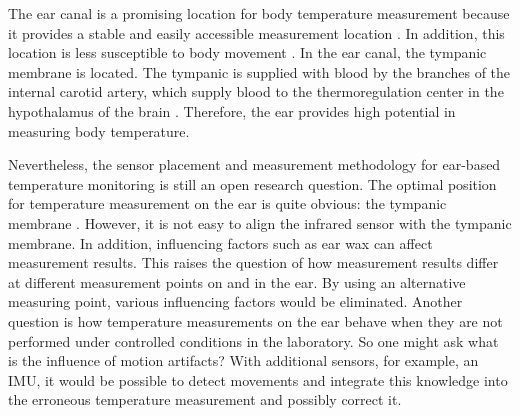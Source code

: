 The ear canal is a promising location for body temperature measurement because it provides a stable and easily accessible measurement location \cite{ericksonComparisonEarbasedBladder1993}.
In addition, this location is less susceptible to body movement \cite{grossmanFrequencyVelocityRotational1988, kavanaghRoleNeckTrunk2006a}.
In the ear canal, the tympanic membrane is located.
The tympanic is supplied with blood by the branches of the internal carotid artery, which supply blood to the thermoregulation center in the hypothalamus of the brain \cite{moranCoreTemperatureMeasurement2002a}.
Therefore, the ear provides high potential in measuring body temperature.

Nevertheless, the sensor placement and measurement methodology for ear-based temperature monitoring is still an open research question. 
The optimal position for temperature measurement on the ear is quite obvious: the tympanic membrane \cite{childsTympanicMembraneTemperature1999, kimComparisonBilateralEardrum2022, mumaComparisonRectalAxillary1991}.
However, it is not easy to align the infrared sensor with the tympanic membrane.
In addition, influencing factors such as ear wax can affect measurement results. 
This raises the question of how measurement results differ at different measurement points on and in the ear. 
By using an alternative measuring point, various influencing factors would be eliminated.
Another question is how temperature measurements on the ear behave when they are not performed under controlled conditions in the laboratory.
So one might ask what is the influence of motion artifacts?
With additional sensors, for example, an IMU, it would be possible to detect movements and integrate this knowledge into the erroneous temperature measurement and possibly correct it.

